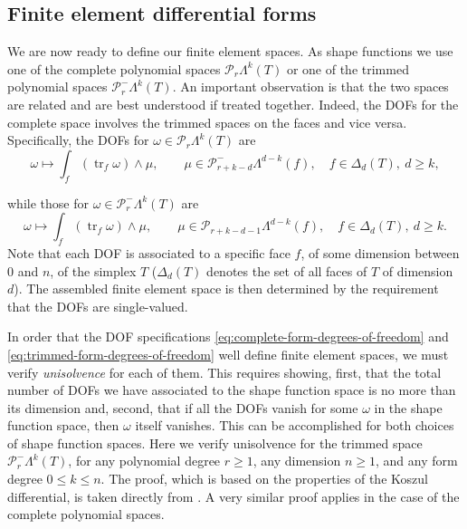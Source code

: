 \subsection{{Finite element differential forms}}\label{sec:finite-element-differential-forms}

{We are now ready to define our finite element spaces. As shape functions we use one of the complete polynomial spaces $\mathcal P_r\Lambda^k(T)$ or one of the trimmed polynomial spaces $\mathcal P_r^-\Lambda^k(T)$. An important observation is that the two spaces are related and are best understood if treated together. Indeed, the DOFs for the complete space involves the trimmed spaces on the faces and vice versa. Specifically, the DOFs for $\omega\in\mathcal P_r\Lambda^k(T)$ are}
\begin{equation}\label{eq:complete-form-degrees-of-freedom}
\omega\mapsto\int_f(\operatorname{tr}_f\omega)\wedge\mu,\qquad\mu\in\mathcal P_{r+k-d}^-\Lambda^{d-k}(f),\quad f\in\Delta_d(T),\ d\geq k,
\end{equation}

{while those for $\omega\in\mathcal P_r^-\Lambda^k(T)$ are}
\begin{equation}\label{eq:trimmed-form-degrees-of-freedom}
\omega\mapsto\int_f(\operatorname{tr}_f\omega)\wedge\mu,\qquad\mu\in\mathcal P_{r+k-d-1}\Lambda^{d-k}(f),\quad f\in\Delta_d(T),\ d\geq k.
\end{equation}
{Note that each DOF is associated to a specific face $f$, of some dimension between $0$ and $n$, of the simplex $T$ ($\Delta_d(T)$ denotes the set of all faces of $T$ of dimension $d$). The assembled finite element space is then determined by the requirement that the DOFs are single-valued.}

{In order that the DOF specifications \eqref{eq:complete-form-degrees-of-freedom} and \eqref{eq:trimmed-form-degrees-of-freedom} well define finite element spaces, we must verify \emph{unisolvence} for each of them. This requires showing, first, that the total number of DOFs we have associated to the shape function space is no more than its dimension and, second, that if all the DOFs vanish for some $\omega$ in the shape function space, then $\omega$ itself vanishes. This can be accomplished for both choices of shape function spaces. Here we verify unisolvence for the trimmed space $\mathcal P_r^-\Lambda^k(T)$, for any polynomial degree $r\geq1$, any dimension $n\geq1$, and any form degree $0\leq k\leq n$. The proof, which is based on the properties of the Koszul differential, is taken directly from . A very similar proof applies in the case of the complete polynomial spaces.}

